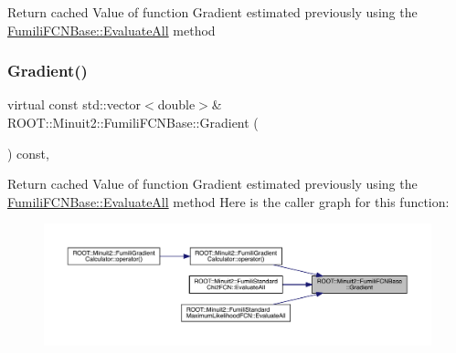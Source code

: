 Return cached Value of function Gradient estimated previously using the \mbox{\hyperlink{classROOT_1_1Minuit2_1_1FumiliFCNBase_a0741bb4a7405cc33ab60583472a189cb}{Fumili\+F\+C\+N\+Base\+::\+Evaluate\+All}} method \mbox{\label{classROOT_1_1Minuit2_1_1FumiliFCNBase_ad226939ea2e83f754b5a6afc30876d3e}} 
\subsubsection{\texorpdfstring{Gradient()}{Gradient()}\hspace{0.1cm}{\footnotesize\ttfamily [2/4]}}
{\footnotesize\ttfamily virtual const std\+::vector$<$double$>$\& R\+O\+O\+T\+::\+Minuit2\+::\+Fumili\+F\+C\+N\+Base\+::\+Gradient (\begin{DoxyParamCaption}{ }\end{DoxyParamCaption}) const\hspace{0.3cm}{\ttfamily [inline]}, {\ttfamily [virtual]}}

Return cached Value of function Gradient estimated previously using the \mbox{\hyperlink{classROOT_1_1Minuit2_1_1FumiliFCNBase_a0741bb4a7405cc33ab60583472a189cb}{Fumili\+F\+C\+N\+Base\+::\+Evaluate\+All}} method Here is the caller graph for this function\+:\nopagebreak
\begin{figure}[H]
\begin{center}
\leavevmode
\includegraphics[width=350pt]{de/dc5/classROOT_1_1Minuit2_1_1FumiliFCNBase_ad226939ea2e83f754b5a6afc30876d3e_icgraph}
\end{center}
\end{figure}
\mbox{\label{classROOT_1_1Minuit2_1_1FumiliFCNBase_a61cd6d04313bf324c6a226e16017ad4f}} 
